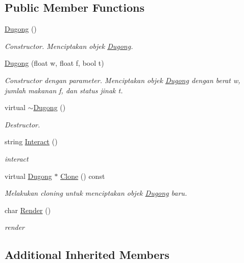 \subsection*{Public Member Functions}
\begin{DoxyCompactItemize}
\item 
\hyperlink{classDugong_ab18a993807c0daa4b4a7eeaf7118ead7}{Dugong} ()
\begin{DoxyCompactList}\small\item\em Constructor. Menciptakan objek \hyperlink{classDugong}{Dugong}. \end{DoxyCompactList}\item 
\hyperlink{classDugong_af4aa8ab8370bbea5ccb75f5dd104f8e8}{Dugong} (float w, float f, bool t)
\begin{DoxyCompactList}\small\item\em Constructor dengan parameter. Menciptakan objek \hyperlink{classDugong}{Dugong} dengan berat w, jumlah makanan f, dan status jinak t. \end{DoxyCompactList}\item 
virtual \hyperlink{classDugong_a0fe188826a301ecf2b90f2eb60c9e5da}{$\sim$\+Dugong} ()
\begin{DoxyCompactList}\small\item\em Destructor. \end{DoxyCompactList}\item 
string \hyperlink{classDugong_a861c589c05a791faf03297eb6e718d9e}{Interact} ()
\begin{DoxyCompactList}\small\item\em interact \end{DoxyCompactList}\item 
virtual \hyperlink{classDugong}{Dugong} $\ast$ \hyperlink{classDugong_a8209b4208bd32dfc0fa4e701679306c1}{Clone} () const 
\begin{DoxyCompactList}\small\item\em Melakukan cloning untuk menciptakan objek \hyperlink{classDugong}{Dugong} baru. \end{DoxyCompactList}\item 
char \hyperlink{classDugong_af82a8983c960604aa27dabe7fec53362}{Render} ()
\begin{DoxyCompactList}\small\item\em render \end{DoxyCompactList}\end{DoxyCompactItemize}
\subsection*{Additional Inherited Members}


